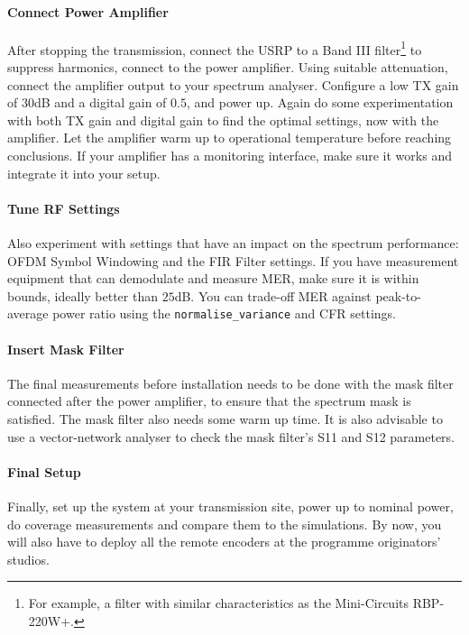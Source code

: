 \paragraph{Connect Power Amplifier}
After stopping the transmission, connect the USRP to a Band III
filter\footnote{For example, a filter with similar characteristics as the
Mini-Circuits RBP-220W+.} to suppress harmonics, connect to the power amplifier.
Using suitable attenuation, connect the amplifier output to your spectrum
analyser.
Configure a low TX gain of $30$dB and a digital gain of $0.5$, and power up.
Again do some experimentation with both TX gain and digital gain to find the
optimal settings, now with the amplifier. Let the amplifier warm up to
operational temperature before reaching conclusions. If your amplifier has a
monitoring interface, make sure it works and integrate it into your setup.

\paragraph{Tune RF Settings}
Also experiment with settings that have an impact on the spectrum performance:
OFDM Symbol Windowing and the FIR Filter settings.
If you have measurement equipment that can demodulate and measure MER, make sure
it is within bounds, ideally better than $25$dB.
You can trade-off MER against peak-to-average power ratio using the
\verb+normalise_variance+ and CFR settings.

\paragraph{Insert Mask Filter}
The final measurements before installation needs to be done with the mask
filter connected after the power amplifier, to ensure that the spectrum mask is
satisfied. The mask filter also needs some warm up time.
It is also advisable to use a vector-network analyser to check the
mask filter's S11 and S12 parameters.

\paragraph{Final Setup}
Finally, set up the system at your transmission site, power up to nominal power,
do coverage measurements and compare them to the simulations.
By now, you will also have to deploy all the remote encoders at the programme
originators' studios.

